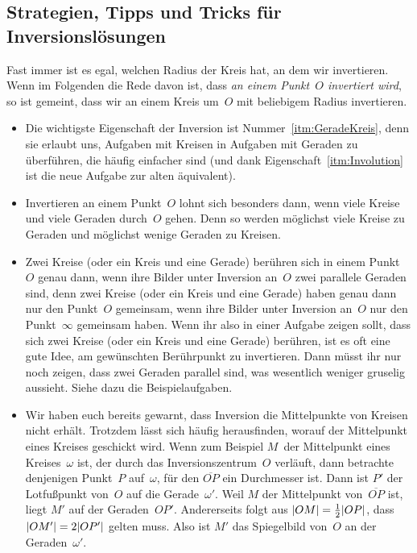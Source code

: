 \subsection*{Strategien, Tipps und Tricks für Inversionslösungen}
Fast immer ist es egal, welchen Radius der Kreis hat, an dem wir invertieren. Wenn im Folgenden die Rede davon ist, dass \emph{an einem Punkt~$O$ invertiert wird}, so ist gemeint, dass wir an einem Kreis um~$O$ mit beliebigem Radius invertieren.
\begin{itemize}
	\item Die wichtigste Eigenschaft der Inversion ist Nummer~\ref{itm:GeradeKreis}, denn sie erlaubt uns, Aufgaben mit Kreisen in Aufgaben mit Geraden zu überführen, die häufig einfacher sind (und dank Eigenschaft~\ref{itm:Involution} ist die neue Aufgabe zur alten äquivalent).
	\item Invertieren an einem Punkt~$O$ lohnt sich besonders dann, wenn viele Kreise und viele Geraden durch~$O$ gehen. Denn so werden möglichst viele Kreise zu Geraden und möglichst wenige Geraden zu Kreisen.
	\item Zwei Kreise (oder ein Kreis und eine Gerade) berühren sich in einem Punkt~$O$ genau dann, wenn ihre Bilder unter Inversion an~$O$ zwei parallele Geraden sind, denn zwei Kreise (oder ein Kreis und eine Gerade) haben genau dann nur den Punkt~$O$ gemeinsam, wenn ihre Bilder unter Inversion an~$O$ nur den Punkt~$\infty$ gemeinsam haben. Wenn ihr also in einer Aufgabe zeigen sollt, dass sich zwei Kreise (oder ein Kreis und eine Gerade) berühren, ist es oft eine gute Idee, am gewünschten Berührpunkt zu invertieren. Dann müsst ihr nur noch zeigen, dass zwei Geraden parallel sind, was wesentlich weniger gruselig aussieht. Siehe dazu die Beispielaufgaben.
	\item Wir haben euch bereits gewarnt, dass Inversion die Mittelpunkte von Kreisen nicht erhält. Trotzdem lässt sich häufig herausfinden, worauf der Mittelpunkt eines Kreises geschickt wird. Wenn zum Beispiel $M$~der Mittelpunkt eines Kreises~$\omega$ ist, der durch das Inversionszentrum~$O$ verläuft, dann betrachte denjenigen Punkt~$P$ auf~$\omega$, für den $\overline{OP}$ ein Durchmesser ist. Dann ist $P'$ der Lotfußpunkt von~$O$ auf die Gerade~$\omega'$. Weil $M$ der Mittelpunkt von~$\overline{OP}$ ist, liegt $M'$ auf der Geraden~$OP'$. Andererseits folgt aus $\lvert OM\rvert=\frac 12\lvert OP\rvert$, dass $\lvert OM'\rvert=2\lvert OP'\rvert$ gelten muss. Also ist $M'$ das Spiegelbild von~$O$ an der Geraden~$\omega'$.
	

\end{itemize}
